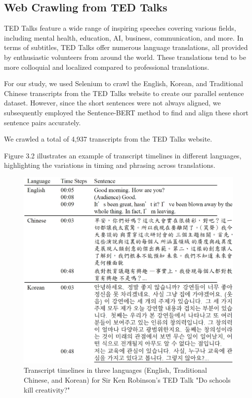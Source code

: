 \documentclass[PhD]{PHlab-thesis}
\begin{document}
\subsection{Web Crawling from TED Talks}
TED Talks feature a wide range of inspiring speeches covering various fields, including mental health, education, AI, business, communication, and more. In terms of subtitles, TED Talks offer numerous language translations, all provided by enthusiastic volunteers from around the world. These translations tend to be more colloquial and localized compared to professional translations.

For our study, we used Selenium to crawl the English, Korean, and Traditional Chinese transcripts from the TED Talks website to create our parallel sentence dataset. However, since the short sentences were not always aligned, we subsequently employed the Sentence-BERT method to find and align these short sentence pairs accurately.

We crawled a total of 4,937 transcripts from the TED Talks website.

Figure 3.2 illustrates an example of transcript timelines in different languages, highlighting the variations in timing and phrasing across translations.

\begin{figure}[h!]
  \centering
  \includegraphics[width=\linewidth]{fig_3_2.jpg}
  \captionsetup{type=figure}
  \caption{Transcript timelines in three languages (English, Traditional Chinese, and Korean) for Sir Ken Robinson's TED Talk "Do schools kill creativity?"}
  \label{fig:transcript}
\end{figure}
\end{document}
